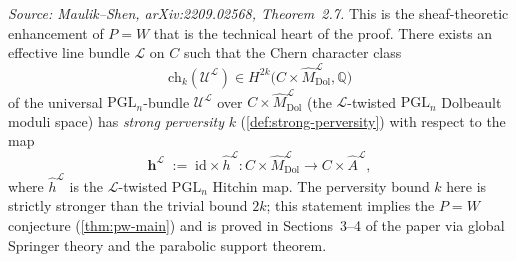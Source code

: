 \begin{theorem}
  \label{thm:strong-perversity-chern}
  \textit{Source: Maulik--Shen, arXiv:2209.02568, Theorem~2.7.}
  This is the sheaf-theoretic enhancement of $P=W$ that is the technical heart of the proof.
  There exists an effective line bundle $\mathcal{L}$ on $C$ such that the Chern character
  class
  \[
    \mathrm{ch}_k(\mathcal{U}^{\mathcal{L}})
    \in H^{2k}\bigl(C \times \widehat{M}^{\mathcal{L}}_{\mathrm{Dol}}, \mathbb{Q}\bigr)
  \]
  of the universal $\mathrm{PGL}_n$-bundle $\mathcal{U}^{\mathcal{L}}$ over
  $C \times \widehat{M}^{\mathcal{L}}_{\mathrm{Dol}}$ (the $\mathcal{L}$-twisted $\mathrm{PGL}_n$
  Dolbeault moduli space) has \emph{strong perversity} $k$ (\cref{def:strong-perversity}) with
  respect to the map
  \[
    \mathbf{h}^{\mathcal{L}} \;:=\; \mathrm{id} \times \widehat{h}^{\mathcal{L}}
    \colon C \times \widehat{M}^{\mathcal{L}}_{\mathrm{Dol}}
    \to C \times \widehat{A}^{\mathcal{L}},
  \]
  where $\widehat{h}^{\mathcal{L}}$ is the $\mathcal{L}$-twisted $\mathrm{PGL}_n$ Hitchin map.
  The perversity bound $k$ here is strictly stronger than the trivial bound $2k$; this
  statement implies the $P=W$ conjecture (\cref{thm:pw-main}) and is proved in Sections~3--4 of
  the paper via global Springer theory and the parabolic support theorem.
\end{theorem}
